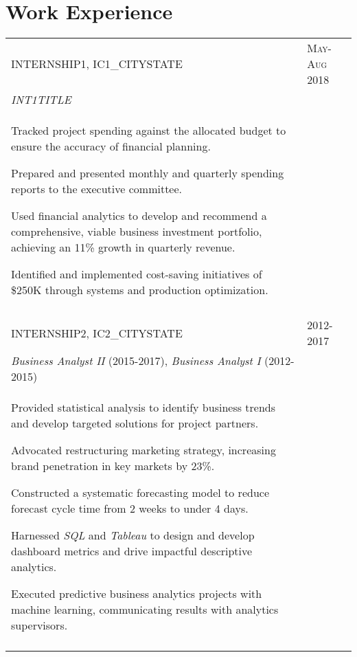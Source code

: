 \documentclass[a4paper,10pt]{article}
\begin{document}
\section{Work Experience}
\begin{supertabular}{p{13.9cm}>{\raggedleft\arraybackslash}p{3.4cm}}

	\textsc{INTERNSHIP1}, IC1_CITYSTATE
	& \textsc{May-Aug 2018} \\
	\small	\emph{INT1TITLE} & \\
	\begin{enumerate*}[label =$\circ$, itemjoin={\newline}]
		\item \footnotesize Tracked project spending against the allocated budget to ensure the accuracy of financial planning.
		\item \footnotesize Prepared and presented monthly and quarterly spending reports to the executive committee.
		\item \footnotesize Used financial analytics to develop and recommend a comprehensive, viable business investment portfolio, achieving an 11\% growth in quarterly revenue.
		\item \footnotesize Identified and implemented cost-saving initiatives of \$250K through systems and production optimization.
	\end{enumerate*} & \\
	 \\




	\textsc{INTERNSHIP2}, IC2_CITYSTATE
	& \textsc{2012-2017} \\
	\small	\emph{Business Analyst II} (2015-2017), \emph{Business Analyst I} (2012-2015) & \\
	\begin{enumerate*}[label =$\circ$, itemjoin={\newline}]
		\item \footnotesize Provided statistical analysis to identify business trends and develop targeted solutions for project partners.
		\item \footnotesize	Advocated restructuring marketing strategy, increasing brand penetration in key markets by 23\%.
		\item \footnotesize Constructed a systematic forecasting model to reduce forecast cycle time from 2 weeks to under 4 days.
		\item \footnotesize Harnessed \emph{SQL} and \emph{Tableau} to design and develop dashboard metrics and drive impactful descriptive analytics.
		\item \footnotesize Executed predictive business analytics projects with machine learning, communicating results with analytics supervisors.
	\end{enumerate*} & \\
	 \\


\end{supertabular}
\end{document}
